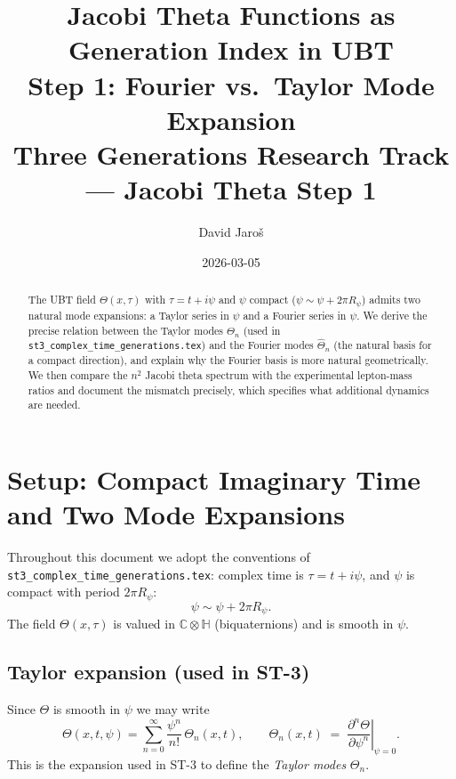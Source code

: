 \documentclass[12pt,a4paper]{article}
\title{%
  Jacobi Theta Functions as Generation Index in UBT\\
  Step 1: Fourier vs.\ Taylor Mode Expansion\\
  \large Three Generations Research Track --- Jacobi Theta Step 1
}
\author{David Jaro\v{s}}
\date{2026-03-05}
\theoremstyle{remark}
\newcommand{\C}{\mathbb{C}}
\newcommand{\H}{\mathbb{H}}
\begin{document}
\maketitle

\begin{abstract}
The UBT field $\Theta(x,\tau)$ with $\tau = t + i\psi$ and $\psi$ compact
($\psi \sim \psi + 2\pi R_\psi$) admits two natural mode expansions: a
Taylor series in $\psi$ and a Fourier series in $\psi$.  We derive the
precise relation between the Taylor modes $\Theta_n$ (used in
\texttt{st3\_complex\_time\_generations.tex}) and the Fourier modes
$\hat{\Theta}_n$ (the natural basis for a compact direction), and explain
why the Fourier basis is more natural geometrically.  We then compare the
$n^2$ Jacobi theta spectrum with the experimental lepton-mass ratios and
document the mismatch precisely, which specifies what additional dynamics
are needed.
\end{abstract}

\tableofcontents

\section{Setup: Compact Imaginary Time and Two Mode Expansions}
\label{sec:setup}

Throughout this document we adopt the conventions of
\texttt{st3\_complex\_time\_generations.tex}: complex time is
$\tau = t + i\psi$, and $\psi$ is compact with period $2\pi R_\psi$:
\begin{equation}
  \psi \sim \psi + 2\pi R_\psi .
\end{equation}
The field $\Theta(x,\tau)$ is valued in $\C\otimes\H$ (biquaternions)
and is smooth in $\psi$.

\subsection{Taylor expansion (used in ST-3)}

Since $\Theta$ is smooth in $\psi$ we may write
\begin{equation}
  \label{eq:taylor}
  \Theta(x,t,\psi)
  = \sum_{n=0}^{\infty} \frac{\psi^n}{n!}\,\Theta_n(x,t),
  \qquad
  \Theta_n(x,t) \;=\; \left.\frac{\partial^n\Theta}{\partial\psi^n}
                       \right|_{\psi=0}.
\end{equation}
This is the expansion used in ST-3 to define the
\emph{Taylor modes} $\Theta_n$.
\end{document}
